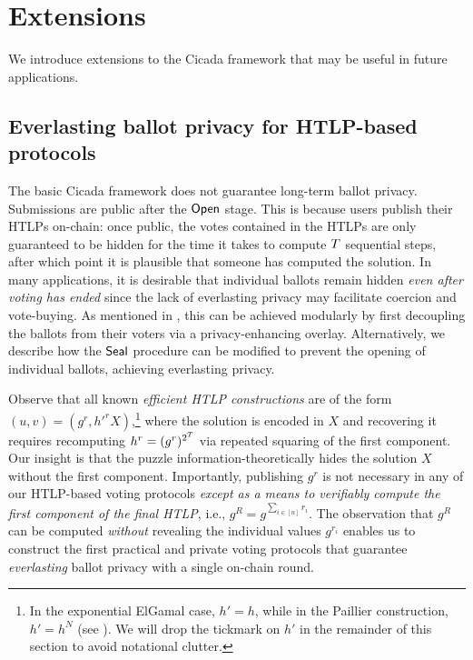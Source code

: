\section{Extensions}\label{sec:cicada_extensions}
We introduce extensions to the Cicada framework that may be useful in future applications.

\subsection{Everlasting ballot privacy for HTLP-based protocols}\label{sec:everlasting_ballot_privacy}




The basic Cicada framework does not guarantee long-term ballot privacy. Submissions are public after the $\mathsf{Open}$ stage. This is because users publish their HTLPs on-chain: once public, the votes contained in the HTLPs are only guaranteed to be hidden for the time it takes to compute $T$ sequential steps, after which point it is plausible that someone has computed the solution. In many applications, it is desirable that individual ballots remain hidden \emph{even after voting has ended} since the lack of everlasting privacy may facilitate coercion and vote-buying. As mentioned in , this can be achieved modularly by first decoupling the ballots from their voters via a privacy-enhancing overlay. Alternatively, we describe how the $\mathsf{Seal}$ procedure can be modified to prevent the opening of individual ballots, achieving everlasting privacy.

Observe that all known \emph{efficient HTLP constructions} are of the form $(u,v) = (g^r, {h'}^r X)$,\footnote{In the exponential ElGamal case, $h' = h$, while in the Paillier construction, $h' = h^N$ (see ). We will drop the tickmark on $h'$ in the remainder of this section to avoid notational clutter.} where the solution is encoded in $X$ and recovering it requires recomputing $h^r=(g^{r})^{2^{T}}$ via repeated squaring of the first component. Our insight is that the puzzle information-theoretically hides the solution $X$ without the first component. Importantly, publishing $g^r$ is not necessary in any of our HTLP-based voting protocols \emph{except as a means to verifiably compute the first component of the final HTLP}, i.e., $g^{R}=g^{\sum_{i\in[n]} r_i}$. The observation that $g^R$ can be computed \emph{without} revealing the individual values $g^{r_i}$ enables us to construct the first practical and private voting protocols that guarantee \emph{everlasting} ballot privacy with a single on-chain round.

